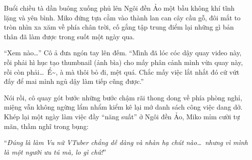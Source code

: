 \documentclass[../main.tex]{subfiles}
\begin{document}
\ct

Buổi chiều tà dần buông xuống phủ lên Ngôi đền Ảo một bầu không khí tĩnh lặng và yên bình. Miko đứng tựa cằm vào thành lan can cây cầu gỗ, đôi mắt to tròn nhìn xa xăm về phía chân trời, cố gắng tập trung điểm lại những gì bản thân đã làm được trong suốt một ngày qua.


``Xem nào\dots'' Cô ả đưa ngón tay lên đếm. ``Mình đã lóc cóc dậy quay video này, rồi phải hì hục tạo thumbnail (ảnh bìa) cho mấy phân cảnh mình vừa quay này, rồi còn phải\dots\ Ể\~{}, à mà thôi bỏ đi, mệt quá. Chắc mấy việc lắt nhắt đó cứ vứt đấy để mai mình ngủ dậy làm tiếp cũng được.''

Nói rồi, cô quay gót bước những bước chậm rãi thong dong về phía phòng nghỉ, miệng vẫn không ngừng lẩm nhẩm kiểm kê lại mớ danh sách công việc dang dở. Khép lại một ngày làm việc đầy ``năng suất'' ở Ngôi đền Ảo, Miko mỉm cười tự mãn, thầm nghĩ trong bụng:

``\textit{Đúng là làm Vu nữ VTuber chẳng dễ dàng và nhàn hạ chút nào\dots\ nhưng vì mình là một người ưu tú mà, lo gì chứ!}''
\end{document}
